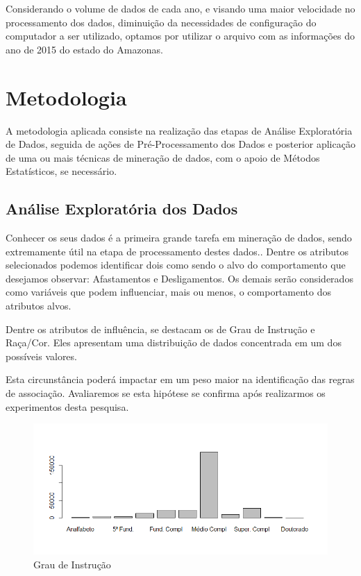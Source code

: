 \documentclass[12pt]{article}
\begin{document}
Considerando o volume de dados de cada ano, e visando uma maior velocidade no processamento dos dados, diminuição da necessidades de configuração do computador a ser utilizado, optamos por utilizar o arquivo com as informações do ano de 2015 do estado do Amazonas.

\section{Metodologia}

A metodologia aplicada consiste na realização das etapas de Análise Exploratória de Dados, seguida de ações de Pré-Processamento dos Dados e posterior aplicação de uma ou mais técnicas de mineração de dados, com o apoio de Métodos Estatísticos, se necessário.

\subsection{Análise Exploratória dos Dados}

Conhecer os seus dados é a primeira grande tarefa em mineração de dados, sendo extremamente útil na etapa de processamento destes dados.\cite{Han2012}. Dentre os atributos selecionados podemos identificar dois como sendo o alvo do comportamento que desejamos observar: Afastamentos e Desligamentos. Os demais serão considerados como variáveis que podem influenciar, mais ou menos, o comportamento dos atributos alvos.

Dentre os atributos de influência, se destacam os de Grau de Instrução e Raça/Cor. Eles apresentam uma distribuição de dados concentrada em um dos possíveis valores.

Esta circunstância poderá impactar em um peso maior na identificação das regras de associação. Avaliaremos se esta hipótese se confirma após realizarmos os experimentos desta pesquisa.

\FloatBarrier
\begin{figure}[!htb]
\centering
\includegraphics[width=1.0\textwidth]{Instrucao.png}
\caption{Grau de Instrução}
\label{fig:exampleFig10}
\end{figure}
\end{document}
